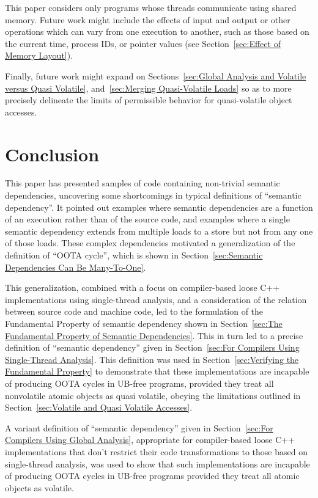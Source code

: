 \documentclass[10]{article}
\begin{document}
This paper considers only programs whose threads
communicate using shared memory.
Future work might include the effects of input and output or
other operations which can vary from one execution to another,
such as those based on the current time, process IDs, or pointer values
(see Section~\ref{sec:Effect of Memory Layout}).

Finally, future work might expand on
Sections~\ref{sec:Global Analysis and Volatile versus Quasi Volatile},
and~\ref{sec:Merging Quasi-Volatile Loads}
so as to more precisely delineate the limits of permissible
behavior for quasi-volatile object accesses.

\section{Conclusion}
\label{sec:Conclusion}

This paper has presented samples of code containing non-trivial
semantic dependencies, uncovering some shortcomings in typical definitions of
``semantic dependency''.
It pointed out examples where semantic dependencies
are a function of an execution rather than of the source code, and examples
where a single semantic dependency extends from multiple loads
to a store but not from any one of those loads.
These complex dependencies motivated a generalization of the definition
of ``OOTA cycle'', which is shown in
Section~\ref{sec:Semantic Dependencies Can Be Many-To-One}.

This generalization, combined with a focus on compiler-based loose C++
implementations using single-thread analysis, and a consideration of
the relation between source code and machine code, led to the formulation
of the Fundamental Property of semantic dependency shown in
Section~\ref{sec:The Fundamental Property of Semantic Dependencies}.
This in turn led to a precise definition of ``semantic dependency'' given in
Section~\ref{sec:For Compilers Using Single-Thread Analysis}.
This definition was used in
Section~\ref{sec:Verifying the Fundamental Property}
to demonstrate that these implementations are
incapable of producing OOTA cycles in UB-free programs,
provided they treat all nonvolatile atomic objects as
quasi volatile, obeying the limitations outlined in
Section~\ref{sec:Volatile and Quasi Volatile Accesses}.

A variant definition of ``semantic dependency'' given in
Section~\ref{sec:For Compilers Using Global Analysis}, appropriate for
compiler-based loose C++ implementations that don't restrict
their code transformations to those based on single-thread analysis,
was used to show that such implementations
are incapable of producing OOTA cycles in UB-free programs
provided they treat all atomic objects as volatile.
\end{document}
